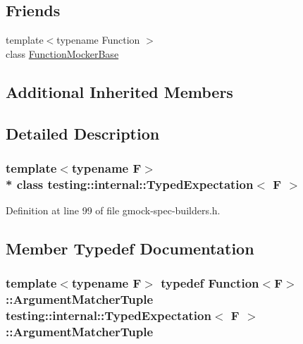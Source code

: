 \subsection*{Friends}
\begin{DoxyCompactItemize}
\item 
{\footnotesize template$<$typename Function $>$ }\\class \hyperlink{classtesting_1_1internal_1_1_typed_expectation_a1771ea4a3d92d8b2ff0f0aa6fc40ff55}{Function\+Mocker\+Base}
\end{DoxyCompactItemize}
\subsection*{Additional Inherited Members}


\subsection{Detailed Description}
\subsubsection*{template$<$typename F$>$\\*
class testing\+::internal\+::\+Typed\+Expectation$<$ F $>$}



Definition at line 99 of file gmock-\/spec-\/builders.\+h.



\subsection{Member Typedef Documentation}
\subsubsection[{\texorpdfstring{Argument\+Matcher\+Tuple}{ArgumentMatcherTuple}}]{\setlength{\rightskip}{0pt plus 5cm}template$<$typename F$>$ typedef {\bf Function}$<$F$>$\+::{\bf Argument\+Matcher\+Tuple} {\bf testing\+::internal\+::\+Typed\+Expectation}$<$ F $>$\+::{\bf Argument\+Matcher\+Tuple}}\hypertarget{classtesting_1_1internal_1_1_typed_expectation_a8f10e3906761cc5c10fa3561c6e8938e}{}\label{classtesting_1_1internal_1_1_typed_expectation_a8f10e3906761cc5c10fa3561c6e8938e}


